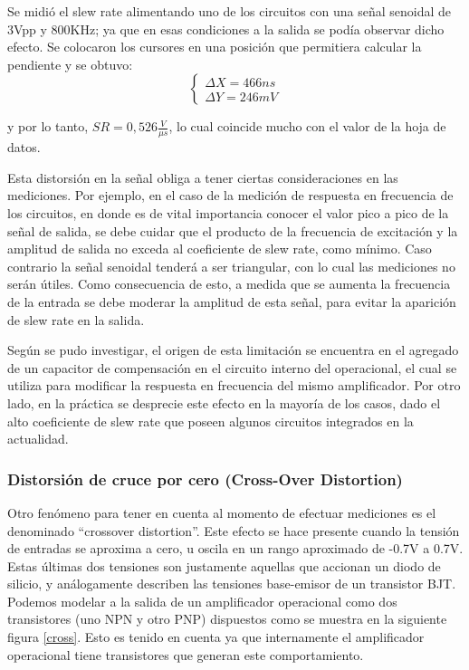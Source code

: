 	Se midi\'o el slew rate alimentando uno de los circuitos con una se\~nal senoidal de 3Vpp y 800KHz;
	ya que en esas condiciones a la salida se pod\'ia observar dicho efecto. Se colocaron los cursores en 
	una posici\'on que permitiera calcular la pendiente y se obtuvo:
	\begin{equation}
		\begin{cases}
			\Delta X = 466 ns \\
			\Delta Y = 246 mV
		\end{cases}
		\label{srmedicion}
	\end{equation}

	y por lo tanto, $SR = 0,526 \frac{V}{\mu s}$, lo cual coincide mucho con el valor de la hoja de datos.
	

	Esta distorsión en la se\~nal obliga a tener ciertas consideraciones en las mediciones. 
	Por ejemplo, en el caso de la medici\'on de respuesta en frecuencia de los circuitos, 
	en donde es de vital importancia conocer el valor pico a pico de la se\~nal de salida, 
	se debe cuidar que el producto de la frecuencia de excitaci\'on y la amplitud de salida no
	 exceda al coeficiente de slew rate, como mínimo. Caso contrario la señal senoidal tenderá 
	 a ser triangular, con lo cual las mediciones no serán útiles. Como consecuencia de esto, 
	 a medida que se aumenta la frecuencia de la entrada se debe moderar la amplitud de esta 
	 señal, para evitar la aparición de slew rate en la salida.

	 Según se pudo investigar, el origen de esta limitación se encuentra en el agregado de un 
	 capacitor de compensación en el circuito interno del operacional, el cual se utiliza 
	 para modificar la respuesta en frecuencia del mismo amplificador. Por otro lado, en 
	 la práctica se desprecie este efecto en la mayoría de los casos, dado el alto coeficiente 
	 de slew rate que poseen algunos circuitos integrados en la actualidad. 



	\subsubsection{Distorsi\'on de cruce por cero (Cross-Over Distortion)}
	Otro fenómeno para tener en cuenta al momento de efectuar mediciones es el
	 denominado “crossover distortion”. Este efecto se hace presente cuando la tensión 
	 de entradas se aproxima a cero, u oscila en un rango aproximado de -0.7V a 0.7V.
	  Estas últimas dos tensiones son justamente aquellas que accionan un diodo de silicio, 
	  y análogamente describen las tensiones base-emisor de un transistor BJT.
Podemos modelar a la salida de un amplificador operacional como dos transistores 
(uno NPN y otro PNP) dispuestos como se muestra en la siguiente figura \ref{cross}. Esto es tenido en cuenta 
ya que internamente el amplificador operacional tiene transistores que generan este comportamiento.

